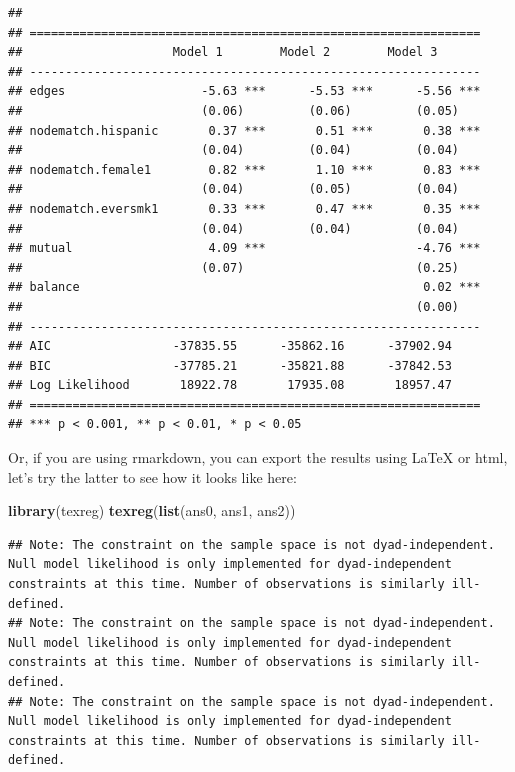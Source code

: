 \documentclass[]{book}
\newenvironment{Shaded}{\begin{snugshade}}{\end{snugshade}}
\newcommand{\KeywordTok}[1]{\textcolor[rgb]{0.13,0.29,0.53}{\textbf{#1}}}
\newcommand{\NormalTok}[1]{#1}
\theoremstyle{definition}
\theoremstyle{definition}
\theoremstyle{definition}
\theoremstyle{remark}
\begin{document}
\begin{verbatim}
## 
## ===============================================================
##                     Model 1        Model 2        Model 3      
## ---------------------------------------------------------------
## edges                   -5.63 ***      -5.53 ***      -5.56 ***
##                         (0.06)         (0.06)         (0.05)   
## nodematch.hispanic       0.37 ***       0.51 ***       0.38 ***
##                         (0.04)         (0.04)         (0.04)   
## nodematch.female1        0.82 ***       1.10 ***       0.83 ***
##                         (0.04)         (0.05)         (0.04)   
## nodematch.eversmk1       0.33 ***       0.47 ***       0.35 ***
##                         (0.04)         (0.04)         (0.04)   
## mutual                   4.09 ***                     -4.76 ***
##                         (0.07)                        (0.25)   
## balance                                                0.02 ***
##                                                       (0.00)   
## ---------------------------------------------------------------
## AIC                 -37835.55      -35862.16      -37902.94    
## BIC                 -37785.21      -35821.88      -37842.53    
## Log Likelihood       18922.78       17935.08       18957.47    
## ===============================================================
## *** p < 0.001, ** p < 0.01, * p < 0.05
\end{verbatim}

Or, if you are using rmarkdown, you can export the results using LaTeX
or html, let's try the latter to see how it looks like here:

\begin{Shaded}
\begin{Highlighting}[]
\KeywordTok{library}\NormalTok{(texreg)}
\KeywordTok{texreg}\NormalTok{(}\KeywordTok{list}\NormalTok{(ans0, ans1, ans2))}
\end{Highlighting}
\end{Shaded}

\begin{verbatim}
## Note: The constraint on the sample space is not dyad-independent. Null model likelihood is only implemented for dyad-independent constraints at this time. Number of observations is similarly ill-defined.
## Note: The constraint on the sample space is not dyad-independent. Null model likelihood is only implemented for dyad-independent constraints at this time. Number of observations is similarly ill-defined.
## Note: The constraint on the sample space is not dyad-independent. Null model likelihood is only implemented for dyad-independent constraints at this time. Number of observations is similarly ill-defined.
\end{verbatim}
\end{document}
